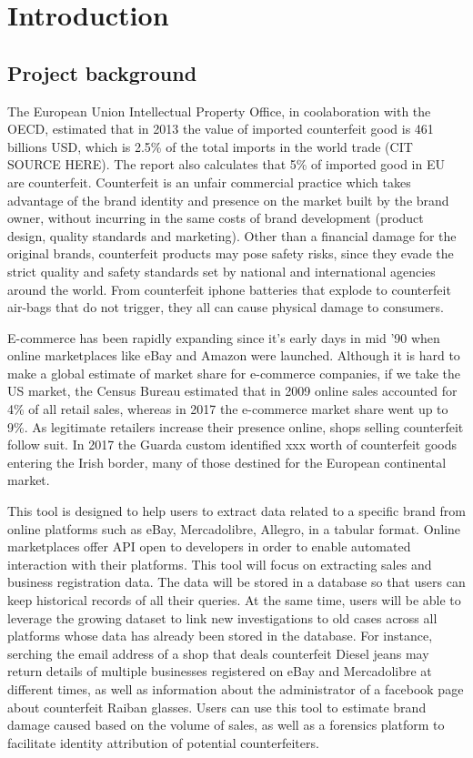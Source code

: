 \chapter{Introduction}

\section{Project background}
The European Union Intellectual Property Office, in coolaboration with the
OECD, estimated that in 2013 the value of imported counterfeit good is 461
billions USD, which is 2.5\% of the total imports in the world trade (CIT
SOURCE HERE). The report also calculates that 5\% of imported good in EU are
counterfeit. Counterfeit is an unfair commercial practice which takes advantage
of the brand identity and presence on the market built by the brand owner,
without incurring in the same costs of brand development (product design,
quality standards and marketing). Other than a financial damage for the original
brands, counterfeit products may pose safety risks, since they evade the strict
quality and safety standards set by national and international agencies around
the world. From counterfeit iphone batteries that explode to counterfeit
air-bags that do not trigger, they all can cause physical damage to consumers.

E-commerce has been rapidly expanding since it's early days in mid '90 when
online marketplaces like eBay and Amazon were launched. Although it is hard to
make a global estimate of market share for e-commerce companies, if we take the
US market, the Census Bureau estimated that in 2009 online sales accounted for
4\% of all retail sales, whereas in 2017 the e-commerce market share went up to
9\%. As legitimate retailers increase their presence online,
shops selling counterfeit follow suit. In 2017 the Guarda custom identified xxx
worth of counterfeit goods entering the Irish border, many of those destined for
the European continental market.

This tool is designed to help users to extract data related to a specific brand
from online platforms such as eBay, Mercadolibre, Allegro, in a tabular format.
Online marketplaces offer API open to developers in order to enable automated
interaction with their platforms. This tool will focus on extracting sales and
business registration data. The data will be stored in a database so that users
can keep historical records of all their queries. At the same time, users will
be able to leverage the growing dataset to link new investigations to old cases
across all platforms whose data has already been stored in the database. For
instance, serching the email address of a shop that deals counterfeit Diesel
jeans may return details of multiple businesses registered on eBay and
Mercadolibre at different times, as well as information about the administrator
of a facebook page about counterfeit Raiban glasses. Users can use this tool to
estimate brand damage caused based on the volume of sales, as well as a
forensics platform to facilitate identity attribution of potential
counterfeiters.

